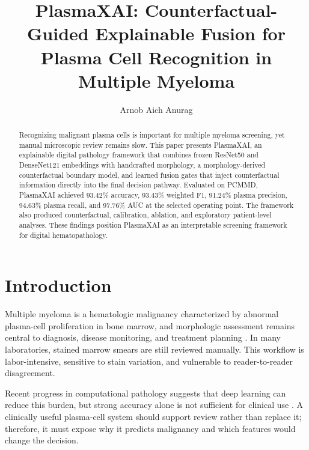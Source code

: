 \documentclass[runningheads]{llncs}
\begin{document}
\title{PlasmaXAI: Counterfactual-Guided Explainable Fusion for Plasma Cell Recognition in Multiple Myeloma}
\author{Arnob Aich Anurag}

\maketitle
\thispagestyle{plain}

\begin{abstract}
Recognizing malignant plasma cells is important for multiple myeloma screening, yet manual microscopic review remains slow. This paper presents PlasmaXAI, an explainable digital pathology framework that combines frozen ResNet50 and DenseNet121 embeddings with handcrafted morphology, a morphology-derived counterfactual boundary model, and learned fusion gates that inject counterfactual information directly into the final decision pathway. Evaluated on PCMMD, PlasmaXAI achieved 93.42\% accuracy, 93.43\% weighted F1, 91.24\% plasma precision, 94.63\% plasma recall, and 97.76\% AUC at the selected operating point. The framework also produced counterfactual, calibration, ablation, and exploratory patient-level analyses. These findings position PlasmaXAI as an interpretable screening framework for digital hematopathology.
\end{abstract}

\section{Introduction}
Multiple myeloma is a hematologic malignancy characterized by abnormal plasma-cell proliferation in bone marrow, and morphologic assessment remains central to diagnosis, disease monitoring, and treatment planning \cite{mmreview}. In many laboratories, stained marrow smears are still reviewed manually. This workflow is labor-intensive, sensitive to stain variation, and vulnerable to reader-to-reader disagreement.

Recent progress in computational pathology suggests that deep learning can reduce this burden, but strong accuracy alone is not sufficient for clinical use \cite{litjens,bera,campanella}. A clinically useful plasma-cell system should support review rather than replace it; therefore, it must expose why it predicts malignancy and which features would change the decision.
\end{document}
